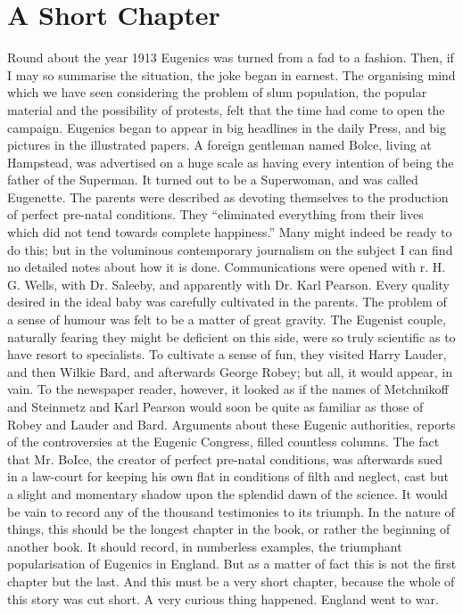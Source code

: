 \documentclass{book}
\begin{document}
\chapter{A Short Chapter}
\label{chapter-19}
Round about the year 1913 Eugenics was turned from a fad to a fashion. Then, if I may so summarise the situation, the joke began in earnest. The organising mind which we have seen considering the problem of slum population, the popular material and the possibility of protests, felt that the time had come to open the campaign. Eugenics began to appear in big headlines in the daily Press, and big pictures in the illustrated papers. A foreign gentleman named Bolce, living at Hampstead, was advertised on a huge scale as having every intention of being the father of the Superman. It turned out to be a Superwoman, and was called Eugenette. The parents were described as devoting themselves to the production of perfect pre-natal conditions. They “eliminated everything from their lives which did not tend towards complete happiness.” Many might indeed be ready to do this; but in the voluminous contemporary journalism on the subject I can find no detailed notes about how it is done. Communications were opened with r. H. G. Wells, with Dr. Saleeby, and apparently with Dr. Karl Pearson. Every quality desired in the ideal baby was carefully cultivated in the parents. The problem of a sense of humour was felt to be a matter of great gravity. The Eugenist couple, naturally fearing they might be deficient on this side, were so truly scientific as to have resort to specialists. To cultivate a sense of fun, they visited Harry Lauder, and then Wilkie Bard, and afterwards George Robey; but all, it would appear, in vain. To the newspaper reader, however, it looked as if the names of Metchnikoff and Steinmetz and Karl Pearson would soon be quite as familiar as those of Robey and Lauder and Bard. Arguments about these Eugenic authorities, reports of the controversies at the Eugenic Congress, filled countless columns. The fact that Mr. BoIce, the creator of perfect pre-natal conditions, was afterwards sued in a law-court for keeping his own flat in conditions of filth and neglect, cast but a slight and momentary shadow upon the splendid dawn of the science. It would be vain to record any of the thousand testimonies to its triumph. In the nature of things, this should be the longest chapter in the book, or rather the beginning of another book. It should record, in numberless examples, the triumphant popularisation of Eugenics in England. But as a matter of fact this is not the first chapter but the last. And this must be a very short chapter, because the whole of this story was cut short. A very curious thing happened. England went to war.
\end{document}

